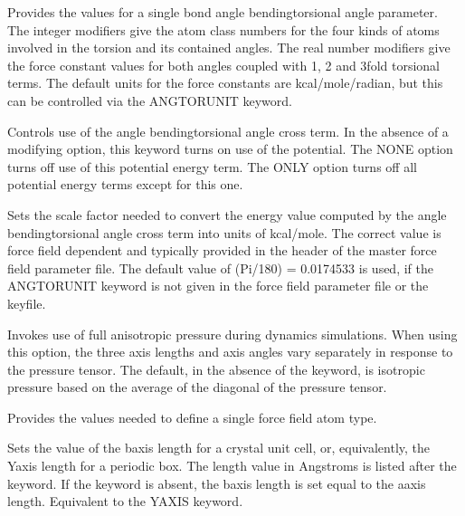 \documentclass[letterpaper,11pt,english]{sphinxmanual}
\begin{document}
  Provides the values for a single bond angle bending\sphinxhyphen{}torsional angle parameter. The integer modifiers give the atom class numbers for the four kinds of atoms involved in the torsion and its contained angles. The real number modifiers give the force constant values for both angles coupled with 1\sphinxhyphen{}, 2\sphinxhyphen{} and 3\sphinxhyphen{}fold torsional terms. The default units for the force constants are kcal/mole/radian, but this can be controlled via the ANGTORUNIT keyword.

  Controls use of the angle bending\sphinxhyphen{}torsional angle cross term. In the absence of a modifying option, this keyword turns on use of the potential. The NONE option turns off use of this potential energy term. The ONLY option turns off all potential energy terms except for this one.

  Sets the scale factor needed to convert the energy value computed by the angle bending\sphinxhyphen{}torsional angle cross term into units of kcal/mole. The correct value is force field dependent and typically provided in the header of the master force field parameter file. The default value of (Pi/180) = 0.0174533 is used, if the ANGTORUNIT keyword is not given in the force field parameter file or the keyfile.

  Invokes use of full anisotropic pressure during dynamics simulations. When using this option, the three axis lengths and axis angles vary separately in response to the pressure tensor. The default, in the absence of the keyword, is isotropic pressure based on the average of the diagonal of the pressure tensor.


  Provides the values needed to define a single force field atom type.



  Sets the value of the b\sphinxhyphen{}axis length for a crystal unit cell, or, equivalently,  the Y\sphinxhyphen{}axis length for a periodic box. The length value in Angstroms is listed after the keyword. If the keyword is absent, the b\sphinxhyphen{}axis length is set equal to the a\sphinxhyphen{}axis length. Equivalent to the Y\sphinxhyphen{}AXIS keyword.
\end{document}
